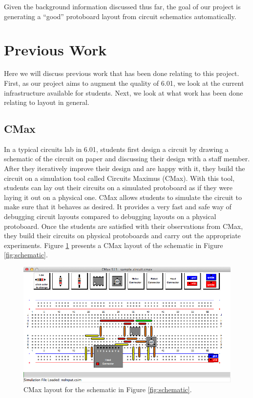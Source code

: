 Given the background information discussed thus far, the goal of our project is
generating a ``good'' protoboard layout from circuit schematics automatically.

\section{Previous Work}

Here we will discuss previous work that has been done relating to this project.
First, as our project aims to augment the quality of 6.01, we look at the
current infrastructure available for students. Next, we look at what work has
been done relating to layout in general.

\subsection{CMax}

In a typical circuits lab in 6.01, students first design a circuit by drawing a
schematic of the circuit on paper and discussing their design with a staff
member. After they iteratively improve their design and are happy with it, they
build the circuit on a simulation tool called Circuits Maximus (CMax)\cite{cmax}.
With this
tool, students can lay out their circuits on a simulated protoboard as if they
were laying it out on a physical one. CMax allows students to simulate the
circuit to make sure that it behaves as desired. It provides a very fast and
safe way of debugging circuit layouts compared to debugging layouts on a
physical protoboard. Once the students are satisfied with their
observations from CMax, they build their circuits on physical protoboards and
carry out the appropriate experiments. Figure \ref{fig:cmax_sample} presents a
CMax layout of the schematic in Figure \ref{fig:schematic}.

\begin{figure}
\begin{center}
\includegraphics[width=\textwidth]{Images/sample_circuit.png}
\caption{CMax layout for the schematic in Figure \ref{fig:schematic}.}
\label{fig:cmax_sample}
\end{center}
\end{figure}

